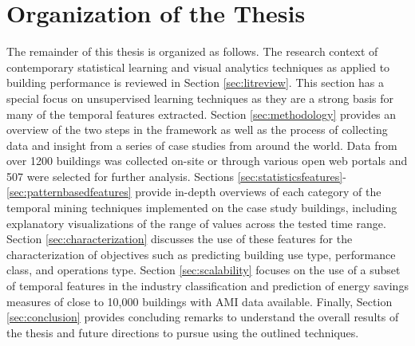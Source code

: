 \section{Organization of the Thesis}
\label{sec:organization}

The remainder of this thesis is organized as follows. The research context of contemporary statistical learning and visual analytics techniques as applied to building performance is reviewed in Section \ref{sec:litreview}. This section has a special focus on unsupervised learning techniques as they are a strong basis for many of the temporal features extracted. Section \ref{sec:methodology} provides an overview of the two steps in the framework as well as the process of collecting data and insight from a series of case studies from around the world. Data from over 1200 buildings was collected on-site or through various open web portals and 507 were selected for further analysis. Sections \ref{sec:statisticsfeatures}-\ref{sec:patternbasedfeatures} provide in-depth overviews of each category of the temporal mining techniques implemented on the case study buildings, including explanatory visualizations of the range of values across the tested time range. Section \ref{sec:characterization} discusses the use of these features for the characterization of objectives such as predicting building use type, performance class, and operations type. Section \ref{sec:scalability} focuses on the use of a subset of temporal features in the industry classification and prediction of energy savings measures of close to 10,000 buildings with AMI data available. Finally, Section \ref{sec:conclusion} provides concluding remarks to understand the overall results of the thesis and future directions to pursue using the outlined techniques.